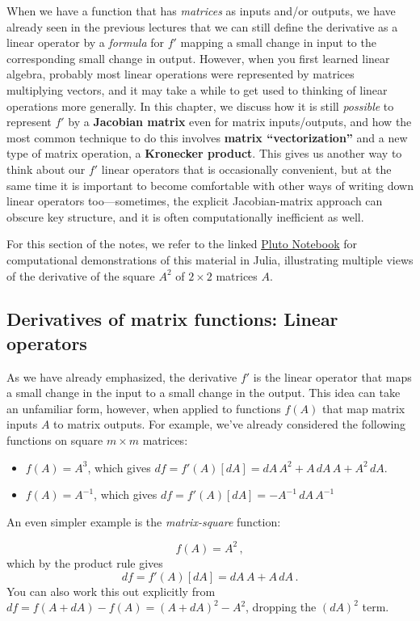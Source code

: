 When we have a function that has \emph{matrices} as inputs and/or
outputs, we have already seen in the previous lectures that we can
still define the derivative as a linear operator by a \emph{formula}
for $f'$ mapping a small change in input to the corresponding small change in output. However,
when you first learned linear algebra, probably most linear operations
were represented by matrices multiplying vectors, and it may take
a while to get used to thinking of linear operations more generally.
In this chapter, we discuss how it is still \emph{possible} to represent
$f'$ by a \textbf{Jacobian matrix} even for matrix inputs/outputs,
and how the most common technique to do this involves \textbf{matrix
``vectorization''} and a new type of matrix operation, a \textbf{Kronecker
product}. This gives us another way to think about our $f'$ linear
operators that is occasionally convenient, but at the same time it
is important to become comfortable with other ways of writing down
linear operators too---sometimes, the explicit Jacobian-matrix approach
can obscure key structure, and it is often computationally inefficient as well.

For this section of the notes, we refer to the linked \href{https://rawcdn.githack.com/mitmath/matrixcalc/3f6758996e40c5c1070279f89f7f65e76e08003d/notes/2x2Jacobians.jl.html}{Pluto Notebook}
for computational demonstrations of this material in Julia, illustrating
multiple views of the derivative of the square $A^{2}$ of $2\times2$
matrices $A$.

\subsection{Derivatives of matrix functions: Linear operators}

As we have already emphasized, the derivative $f'$ is the linear
operator that maps a small change in the input to a small change in
the output. This idea can take an unfamiliar form, however, when applied
to functions $f(A)$ that map matrix inputs $A$ to matrix outputs.
For example, we've already considered the following functions on square
$m\times m$ matrices:
\begin{itemize}
\item $f(A)=A^{3}$, which gives $df=f'(A)[dA]=dA\,A^{2}+A\,dA\,A+A^{2}\,dA$.
\item $f(A)=A^{-1}$, which gives $df=f'(A)[dA]=-A^{-1}\,dA\,A^{-1}$
\end{itemize}
\begin{example}An even simpler example is the \emph{matrix-square}
function:

\[
f(A)=A^{2}\,,
\]
which by the product rule gives 
\[
df=f'(A)[dA]=dA\,A+A\,dA\,.
\]
You can also work this out explicitly from $df=f(A+dA)-f(A)=(A+dA)^{2}-A^{2}$,
dropping the $(dA)^{2}$ term.\end{example}

